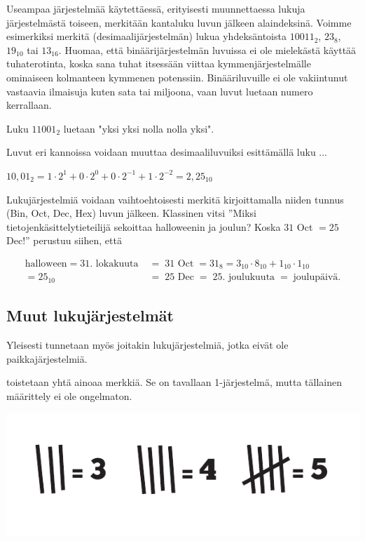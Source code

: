 Useampaa järjestelmää käytettäessä, erityisesti muunnettaessa lukuja järjestelmästä toiseen, merkitään kantaluku luvun jälkeen alaindeksinä. Voimme esimerkiksi merkitä (desimaalijärjestelmän) lukua yhdeksäntoista $10011_2$, $23_8$, $19_{10}$ tai $13_{16}$. Huomaa, että binäärijärjestelmän luvuissa ei ole mielekästä käyttää tuhaterotinta, koska sana tuhat itsessään viittaa kymmenjärjestelmälle ominaiseen kolmanteen kymmenen potenssiin. Binääriluvuille ei ole vakiintunut vastaavia ilmaisuja kuten sata tai miljoona, vaan luvut luetaan numero kerrallaan.

\begin{esimerkki}
Luku $11001_2$ luetaan "yksi yksi nolla nolla yksi".
\end{esimerkki}

Luvut eri kannoissa voidaan muuttaa desimaaliluvuiksi esittämällä luku ...


\begin{esimerkki}
$10,01_2 = 1 \cdot 2^1 + 0 \cdot 2^0 + 0 \cdot 2^{-1} + 1 \cdot 2^{-2} = 2,25_{10}$
\end{esimerkki} %

Lukujärjestelmiä voidaan vaihtoehtoisesti merkitä kirjoittamalla niiden tunnus (Bin, Oct, Dec, Hex) luvun jälkeen. Klassinen vitsi ''Miksi tietojenkäsittelytieteilijä sekoittaa halloweenin ja joulun? Koska $31$ Oct $= 25$ Dec!'' perustuu siihen, että

\begin{align*}
	\text{halloween} \; = \; \text{31. lokakuuta} \; &= \; \text{31 Oct} \; = 31_8 = 3_{10} \cdot 8_{10} + 1_{10} \cdot 1_{10} \\
	= {25}_{10} &= \; \text{25 Dec} \; = \; \text{25. joulukuuta} \; = \; \text{joulupäivä.}
\end{align*} %

\subsection*{Muut lukujärjestelmät}

Yleisesti tunnetaan myös joitakin lukujärjestelmiä, jotka eivät ole paikkajärjestelmiä.

 toistetaan yhtä ainoaa merkkiä. Se on tavallaan 1-järjestelmä, mutta tällainen määrittely ei ole ongelmaton.

\begin{center}
	\includegraphics{pictures/Kuva1-1-tukkimiehenkirjanpito.pdf}
\end{center}

